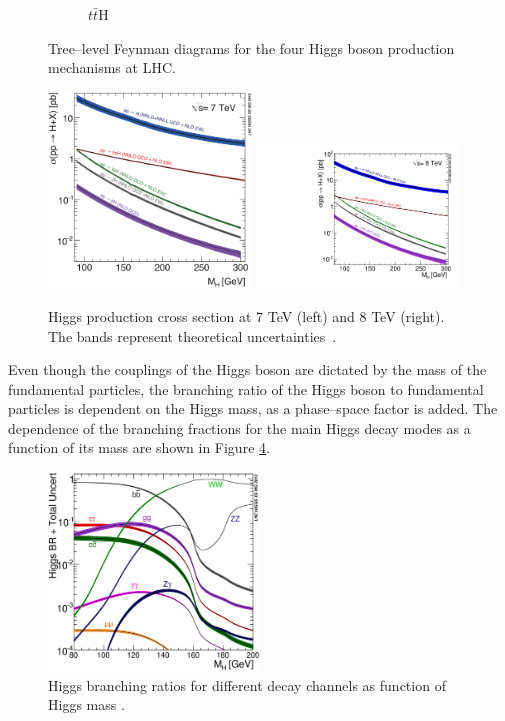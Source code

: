 \begin{figure}
\begin{subfigure}[b]{0.3\textwidth}
                \caption{$t\bar{t}$H}
                \label{fig:tth}
        \end{subfigure}
        \caption{Tree--level Feynman diagrams for the four Higgs boson production mechanisms at LHC.}\label{fig:hprod}
\end{figure}

\begin{figure}
        \centering
	\includegraphics[width=0.48\textwidth]{1_Introduction_Th_and_Exp/pics/Higgs_XS_7TeV_LM.eps}
	\includegraphics[width=0.48\textwidth]{1_Introduction_Th_and_Exp/pics/Higgs_XS_8TeV_LM.pdf}
       \caption{Higgs production cross section at 7 TeV (left) and 8 TeV (right). The bands represent theoretical uncertainties~\cite{Heinemeyer:2013tqa}.}
       \label{fig:hxs}
\end{figure}


Even though the couplings of the Higgs boson are dictated by the mass of the fundamental particles, the branching ratio of the Higgs boson to fundamental particles is dependent on the Higgs mass, as a phase--space factor is added. The dependence of the branching fractions for the main Higgs decay modes as a function of its mass are shown in Figure \ref{fig:hbr}. 

\begin{figure}
\centering
\includegraphics[width=0.5\textwidth]{1_Introduction_Th_and_Exp/pics/Higgs_BR_LM.eps}
\caption{Higgs branching ratios for different decay channels as function of Higgs mass \cite{Heinemeyer:2013tqa}.}
\label{fig:hbr}
\end{figure}

